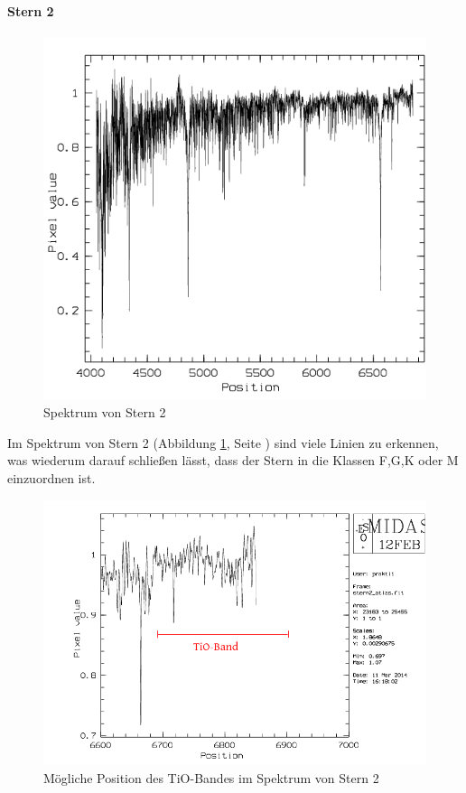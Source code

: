 \paragraph{Stern 2}
\begin{figure}
\includegraphics[height=.4\textheight]{images/stern2_spektrum.png}
\caption{Spektrum von Stern 2}
\label{fig:stern2_spektrum}
\end{figure}
Im Spektrum von Stern 2 (Abbildung \ref{fig:stern2_spektrum}, Seite \pageref{fig:stern2_spektrum}) sind viele Linien zu erkennen, was wiederum darauf schließen lässt, dass der Stern in die Klassen F,G,K oder M einzuordnen ist.
\\
\begin{figure}
\includegraphics[height=.4\textheight]{images/stern2_TiO.png}
\caption{Mögliche Position des TiO-Bandes im Spektrum von Stern 2}
\label{fig:stern2_TiO}
\end{figure}
